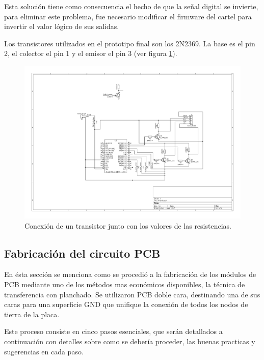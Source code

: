 Esta solución tiene como consecuencia el hecho de que la señal digital se invierte, para eliminar este problema, fue necesario modificar el firmware del cartel para invertir el valor lógico de sus salidas.

Los transistores utilizados en el prototipo final son los 2N2369. %
La base es el pin 2, el colector el pin 1 y el emisor el pin 3 (ver figura \ref{fig:transistors}).

\begin{figure}[ht!]
	\centering
	\begin{center}
		\includegraphics[scale=2]{imagenes/hw/transistor.pdf}
		\caption{Conexión de un transistor junto con los valores de las resistencias.}
		\label{fig:transistors}
	\end{center}
\end{figure}




\subsection{Fabricación del circuito PCB}
En ésta sección se menciona como se procedió a la fabricación de los módulos de PCB mediante uno de los métodos mas económicos disponibles, la técnica de transferencia con planchado. Se utilizaron PCB doble cara, destinando una de sus caras para una superficie GND que unifique la conexión de todos los nodos de tierra de la placa.

Este proceso consiste en cinco pasos esenciales, que serán detallados a continuación con detalles sobre como se debería proceder, las buenas practicas y sugerencias en cada paso.

